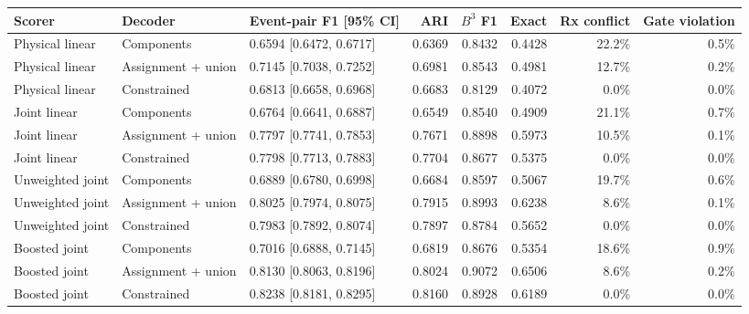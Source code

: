 \begin{tabularx}{\linewidth}{@{}llYrrrrr@{}}\toprule
Scorer & Decoder & Event-pair F1 [95\% CI] & ARI & $B^3$ F1 & Exact & Rx conflict & Gate violation \\\midrule
Physical linear & Components & 0.6594 [0.6472, 0.6717] & 0.6369 & 0.8432 & 0.4428 & 22.2\% & 0.5\% \\
Physical linear & Assignment + union & 0.7145 [0.7038, 0.7252] & 0.6981 & 0.8543 & 0.4981 & 12.7\% & 0.2\% \\
Physical linear & Constrained & 0.6813 [0.6658, 0.6968] & 0.6683 & 0.8129 & 0.4072 & 0.0\% & 0.0\% \\
Joint linear & Components & 0.6764 [0.6641, 0.6887] & 0.6549 & 0.8540 & 0.4909 & 21.1\% & 0.7\% \\
Joint linear & Assignment + union & 0.7797 [0.7741, 0.7853] & 0.7671 & 0.8898 & 0.5973 & 10.5\% & 0.1\% \\
Joint linear & Constrained & 0.7798 [0.7713, 0.7883] & 0.7704 & 0.8677 & 0.5375 & 0.0\% & 0.0\% \\
Unweighted joint & Components & 0.6889 [0.6780, 0.6998] & 0.6684 & 0.8597 & 0.5067 & 19.7\% & 0.6\% \\
Unweighted joint & Assignment + union & 0.8025 [0.7974, 0.8075] & 0.7915 & 0.8993 & 0.6238 & 8.6\% & 0.1\% \\
Unweighted joint & Constrained & 0.7983 [0.7892, 0.8074] & 0.7897 & 0.8784 & 0.5652 & 0.0\% & 0.0\% \\
Boosted joint & Components & 0.7016 [0.6888, 0.7145] & 0.6819 & 0.8676 & 0.5354 & 18.6\% & 0.9\% \\
Boosted joint & Assignment + union & 0.8130 [0.8063, 0.8196] & 0.8024 & 0.9072 & 0.6506 & 8.6\% & 0.2\% \\
Boosted joint & Constrained & 0.8238 [0.8181, 0.8295] & 0.8160 & 0.8928 & 0.6189 & 0.0\% & 0.0\% \\
\bottomrule\end{tabularx}
